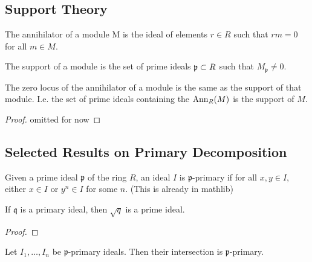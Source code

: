 \subsection{Support Theory}

\begin{definition}
  \label{def:annihilator}
  The annihilator of a module M is the ideal
  of elements $r \in R$ such that $rm = 0$ for 
  all $m \in M$.
\end{definition}

\begin{definition}
  \label{def:support_module}
  The support of a module is the set of prime ideals
  $\mathfrak{p} \subset R$ such that 
  $M_{\mathfrak{p}} \neq 0$.
\end{definition}

\begin{lemma}
  \label{lem:annihilator_zero_locus_support}
  The zero locus of the annihilator of a module
  is the same as the support of that module.
  I.e. the set of prime ideals containing the 
  $\operatorname{Ann}_R(M)$ is the support of $M$.
\end{lemma}

\begin{proof}
  omitted for now
\end{proof}

\subsection{Selected Results on Primary Decomposition}

\begin{definition}
    \label{def:primary}
    Given a prime ideal \(\mathfrak{p}\) of the ring \(R\),
    an ideal \(I\) is \(\mathfrak{p}\)-primary if
    for all \(x, y \in I\), either \(x \in I\) or \(y^n \in I\)
    for some \(n\).
    (This is already in mathlib)
\end{definition}

\begin{lemma}
    \label{lem:radical_isPrime_of_isPrimary}
    If \(\mathfrak{q}\) is a primary ideal, then
    \(\sqrt{q}\) is a prime ideal.
\end{lemma}

\begin{proof}

\end{proof}

\begin{lemma}
    \label{lem:isPrimary_inf_finset}
    Let \(I_{1}, \ldots, I_{n}\) be \(\mathfrak{p}\)-primary ideals.
    Then their intersection is \(\mathfrak{p}\)-primary.
\end{lemma}

